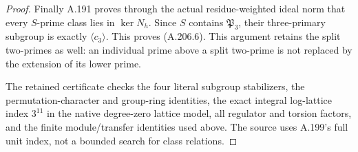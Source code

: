 \begin{proof}
Finally A.191 proves through the actual residue-weighted
ideal norm that every \(S\)-prime class lies in
\(\ker N_h\).  Since \(S\) contains \(\mathfrak P_3\),
their three-primary subgroup is exactly
\(\langle c_3\rangle\).  This proves (A.206.6).
This argument retains the split two-primes as well:
an individual prime above a split two-prime is not
replaced by the extension of its lower prime.

The retained certificate
checks the four literal subgroup stabilizers, the
permutation-character and group-ring identities, the
exact integral log-lattice index \(3^{11}\) in the
native degree-zero lattice model, all regulator and
torsion factors, and the finite module/transfer
identities used above.  The source uses A.199's full
unit index, not a bounded search for class relations.
\end{proof}
